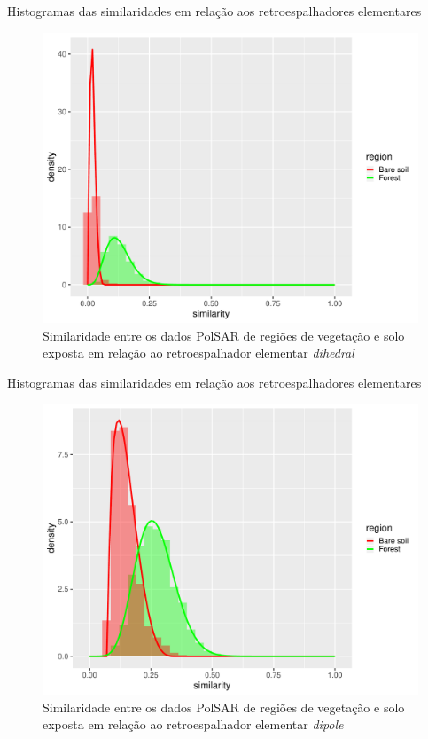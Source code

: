 \documentclass[10pt]{beamer}
\begin{document}
\begin{frame}{Histogramas das similaridades em relação aos retroespalhadores elementares}

\begin{figure}
    \centering
    \includegraphics[width = .6\linewidth]{di.pdf}
    \caption{Similaridade entre os dados PolSAR de regiões de vegetação e solo exposta em relação ao retroespalhador elementar \textit{dihedral}}
    \label{fig:di}
\end{figure}
    
\end{frame}

\begin{frame}{Histogramas das similaridades em relação aos retroespalhadores elementares}

\begin{figure}
    \centering
    \includegraphics[width = .6\linewidth]{dip.pdf}
    \caption{Similaridade entre os dados PolSAR de regiões de vegetação e solo exposta em relação ao retroespalhador elementar \textit{dipole}}
    \label{fig:dip}
\end{figure}
    
\end{frame}
\end{document}
